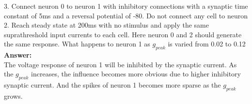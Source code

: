 \documentclass[12pt]{article}
\begin{document}
\newpage

3. Connect neuron 0 to neuron 1 with inhibitory connections with a synaptic time
constant of 5ms and a reversal potential of -80. Do not connect any cell to neuron
2. Reach steady state at 200ms with no stimulus and apply the same
suprathreshold input currents to each cell. Here neuron 0 and 2 should generate
the same response. What happens to neuron 1 as $g_{peak}$ is varied from 0.02 to 0.12
\\

\textbf{Answer:} 
\\

The voltage response of neuron 1 will be inhibited by the synaptic current. As the $g_{peak}$ increases, the influence becomes more obvious due to higher inhibitory synaptic current. And the spikes of neuron 1 becomes more sparse as the $g_{peak}$ grows.
\end{document}
